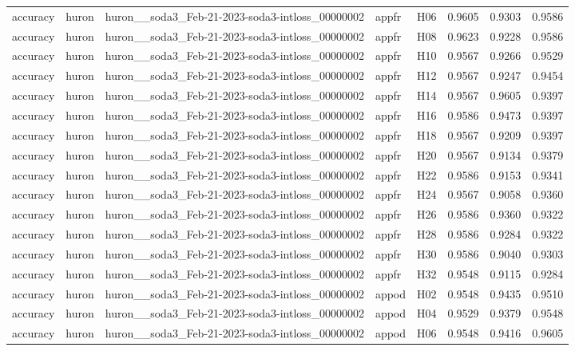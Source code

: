 \begin{table}[tbp]
\begin{tabular}{lllllrrr}
accuracy & huron & huron\_\_soda3\_Feb-21-2023-soda3-intloss\_00000002 & appfr & H06 & 0.9605 & 0.9303 & 0.9586 \\
accuracy & huron & huron\_\_soda3\_Feb-21-2023-soda3-intloss\_00000002 & appfr & H08 & 0.9623 & 0.9228 & 0.9586 \\
accuracy & huron & huron\_\_soda3\_Feb-21-2023-soda3-intloss\_00000002 & appfr & H10 & 0.9567 & 0.9266 & 0.9529 \\
accuracy & huron & huron\_\_soda3\_Feb-21-2023-soda3-intloss\_00000002 & appfr & H12 & 0.9567 & 0.9247 & 0.9454 \\
accuracy & huron & huron\_\_soda3\_Feb-21-2023-soda3-intloss\_00000002 & appfr & H14 & 0.9567 & 0.9605 & 0.9397 \\
accuracy & huron & huron\_\_soda3\_Feb-21-2023-soda3-intloss\_00000002 & appfr & H16 & 0.9586 & 0.9473 & 0.9397 \\
accuracy & huron & huron\_\_soda3\_Feb-21-2023-soda3-intloss\_00000002 & appfr & H18 & 0.9567 & 0.9209 & 0.9397 \\
accuracy & huron & huron\_\_soda3\_Feb-21-2023-soda3-intloss\_00000002 & appfr & H20 & 0.9567 & 0.9134 & 0.9379 \\
accuracy & huron & huron\_\_soda3\_Feb-21-2023-soda3-intloss\_00000002 & appfr & H22 & 0.9586 & 0.9153 & 0.9341 \\
accuracy & huron & huron\_\_soda3\_Feb-21-2023-soda3-intloss\_00000002 & appfr & H24 & 0.9567 & 0.9058 & 0.9360 \\
accuracy & huron & huron\_\_soda3\_Feb-21-2023-soda3-intloss\_00000002 & appfr & H26 & 0.9586 & 0.9360 & 0.9322 \\
accuracy & huron & huron\_\_soda3\_Feb-21-2023-soda3-intloss\_00000002 & appfr & H28 & 0.9586 & 0.9284 & 0.9322 \\
accuracy & huron & huron\_\_soda3\_Feb-21-2023-soda3-intloss\_00000002 & appfr & H30 & 0.9586 & 0.9040 & 0.9303 \\
accuracy & huron & huron\_\_soda3\_Feb-21-2023-soda3-intloss\_00000002 & appfr & H32 & 0.9548 & 0.9115 & 0.9284 \\
accuracy & huron & huron\_\_soda3\_Feb-21-2023-soda3-intloss\_00000002 & appod & H02 & 0.9548 & 0.9435 & 0.9510 \\
accuracy & huron & huron\_\_soda3\_Feb-21-2023-soda3-intloss\_00000002 & appod & H04 & 0.9529 & 0.9379 & 0.9548 \\
accuracy & huron & huron\_\_soda3\_Feb-21-2023-soda3-intloss\_00000002 & appod & H06 & 0.9548 & 0.9416 & 0.9605 \\

\end{tabular}
\end{table}
